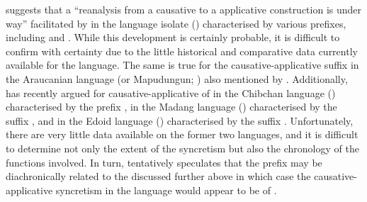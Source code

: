 \cite[12]{malchukov:2017} suggests that a “reanalysis from a causative to a  applicative construction is under way” facilitated by  in the language isolate  () characterised by various prefixes, including  and . While this development is certainly probable, it is difficult to confirm with certainty due to the little historical and comparative data currently available for the language. The same is true for the causative-applicative suffix  in the Araucanian language  (or Mapudungun; ) also mentioned by \cite[9]{malchukov:2017}. Additionally, \cite{van-gysel:2018} has recently argued for cau\-sa\-tive-ap\-pli\-ca\-tive of  in the Chibchan language  () characterised by the prefix , in the Madang language  () characterised by the suffix , and in the Edoid language  () characterised by the suffix . Unfortunately, there are very little data available on the former two languages, and it is difficult to determine not only the extent of the syncretism but also the chronology of the functions involved. In turn, \citeauthor{van-gysel:2018} tentatively speculates that the  prefix may be diachronically related to the   discussed further above in which case the causative-applicative syncretism in the language would appear to be of  \citep{hyman:2007}.

